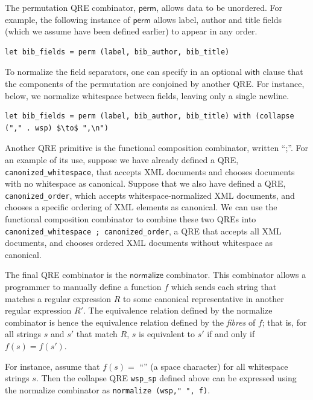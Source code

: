 \documentclass[acmsmall,review,anonymous]{acmart}
\newcommand{\kw}[1]{\textcolor{dkblue}{\ensuremath{\mathsf{#1}}}}
\begin{document}
The permutation QRE combinator, \kw{perm}, allows data to be unordered. For example,
the following instance of \kw{perm} allows label, author and title fields
(which we assume have been defined earlier) to appear in any order.
%
\begin{lstlisting}
let bib_fields = perm (label, bib_author, bib_title)
\end{lstlisting}
%
To normalize the field separators, one can specify 
in an optional \kw{with} clause that the components of the
permutation are conjoined by another QRE. For instance, below, we normalize
whitespace between fields, leaving only a single newline.
%
\begin{lstlisting}
let bib_fields = perm (label, bib_author, bib_title) with (collapse ("," . wsp) $\to$ ",\n")
\end{lstlisting}

Another QRE primitive is the functional composition combinator, written ``;''.
For an example of its use, suppose we have already defined a QRE,
\lstinline{canonized_whitespace}, that accepts XML documents and chooses
documents with no whitespace as canonical. Suppose that we also have defined a
QRE, \lstinline{canonized_order}, which accepts whitespace-normalized XML
documents, and chooses a specific ordering of XML elements as canonical. We can
use the functional composition combinator to combine these two QREs into
\lstinline{canonized_whitespace ; canonized_order}, a QRE that accepts all XML
documents, and chooses ordered XML documents without whitespace as canonical.

The final QRE combinator is the \kw{normalize} combinator. This combinator
allows a programmer to manually define a function $f$ which sends each
string that matches a regular expression $R$ to some canonical
representative in another regular expression $R'$. The equivalence
relation defined by the normalize combinator is hence the equivalence
relation defined by the {\em fibres} of $f$; that is, for all strings
$s$ and $s'$ that match $R$, $s$ is equivalent to $s'$ if and only if
$f(s) = f(s')$.

For instance, assume that $f(s)=$ ``\textvisiblespace'' (a space
character) for all whitespace strings $s$. Then the 
collapse QRE \lstinline{wsp_sp} defined above can
be expressed using the normalize combinator as
\lstinline{normalize (wsp," ", f)}.
\end{document}
